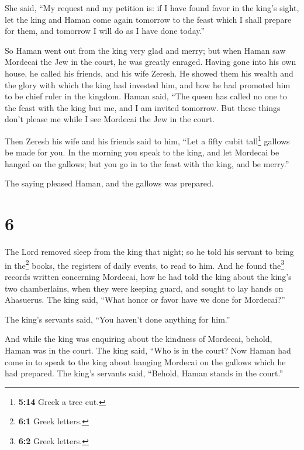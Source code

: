  She said, ``My request and my petition is: 
if I have found favor in the king's sight, let the king and Haman come
again tomorrow to the feast which I shall prepare for them, and tomorrow
I will do as I have done today.''

 So Haman went out from the king very glad and merry; but
when Haman saw Mordecai the Jew in the court, he was greatly enraged.
 Having gone into his own house, he called his friends,
and his wife Zeresh.  He showed them his wealth and the
glory with which the king had invested him, and how he had promoted him
to be chief ruler in the kingdom.  Haman said, ``The
queen has called no one to the feast with the king but me, and I am
invited tomorrow.  But these things don't please me while
I see Mordecai the Jew in the court.

 Then Zeresh his wife and his friends said to him, ``Let
a fifty cubit tall\footnote{\textbf{5:14} Greek a tree cut.} gallows be
made for you. In the morning you speak to the king, and let Mordecai be
hanged on the gallows; but you go in to the feast with the king, and be
merry.''

The saying pleased Haman, and the gallows was prepared.

\hypertarget{section-5}{%
\section{6}\label{section-5}}

 The Lord removed sleep from the king that night; so he
told his servant to bring in the\footnote{\textbf{6:1} Greek letters.}
books, the registers of daily events, to read to him.  And
he found the\footnote{\textbf{6:2} Greek letters.} records written
concerning Mordecai, how he had told the king about the king's two
chamberlains, when they were keeping guard, and sought to lay hands on
Ahasuerus.  The king said, ``What honor or favor have we
done for Mordecai?''

The king's servants said, ``You haven't done anything for him.''

 And while the king was enquiring about the kindness of
Mordecai, behold, Haman was in the court. The king said, ``Who is in the
court? Now Haman had come in to speak to the king about hanging Mordecai
on the gallows which he had prepared.  The king's servants
said, ``Behold, Haman stands in the court.''

